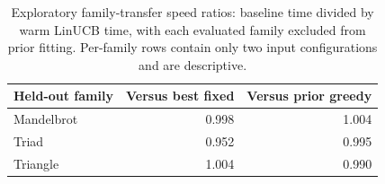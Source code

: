 \begin{table}[ht]
\centering\small
\caption{Exploratory family-transfer speed ratios: baseline time divided by
warm LinUCB time, with each evaluated family excluded from prior fitting.
Per-family rows contain only two input configurations and are descriptive.}
\label{tab:transfer}
\begin{tabular}{lrr}
\hline
Held-out family & Versus best fixed & Versus prior greedy\\
\hline
Mandelbrot & 0.998 & 1.004 \\
Triad & 0.952 & 0.995 \\
Triangle & 1.004 & 0.990 \\
\hline
\end{tabular}
\end{table}
